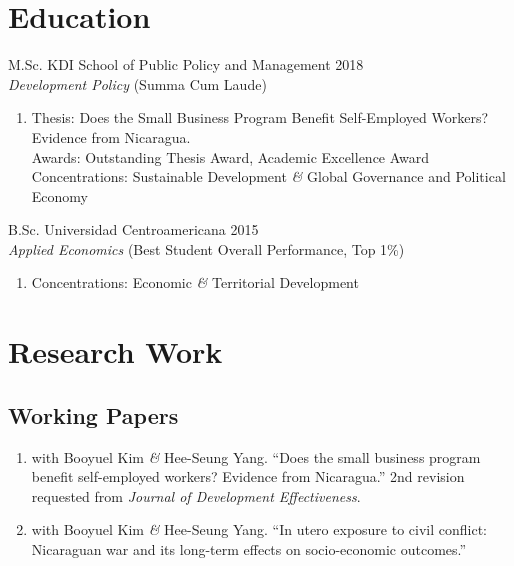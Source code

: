 \documentclass[a4paper, 10pt]{article}
\renewenvironment{itemize}{
  \begin{list}{}
    { \setlength{\itemsep}{5pt}
      \setlength{\parsep}{0pt}
      \setlength{\topsep}{0pt}
      \setlength{\leftmargin}{0em} } }{
  \end{list}}
\begin{document}
\section*{Education}

\begin{itemize}
\item M.Sc. KDI School of Public Policy and Management \hfill 2018 \\
{\small \textit{Development Policy} (Summa Cum Laude)}
  
  \begin{enumerate}[leftmargin=10pt, label={}, nosep]
    \item  Thesis: Does the Small Business Program Benefit Self-Employed Workers? Evidence from Nicaragua. \\ Awards: Outstanding Thesis Award, Academic Excellence Award\\ Concentrations: Sustainable Development \textit{\&} Global Governance and Political Economy
  \end{enumerate}
\item B.Sc. Universidad Centroamericana \hfill 2015 \\
{\small \textit{Applied Economics} (Best Student Overall Performance, Top 1\%)}
  
  \begin{enumerate}[leftmargin=10pt, label={}, nosep]
    \item Concentrations: Economic \textit{\&} Territorial Development
  \end{enumerate}
\end{itemize}


\section*{Research Work}

\subsection*{Working Papers}

\begin{enumerate}[leftmargin=10pt, label={}, itemindent=-10pt, nosep]
\item with Booyuel Kim \textit{\&} Hee-Seung Yang. ``Does the small business program benefit self-employed workers? Evidence from Nicaragua.'' 2nd revision requested from \textit{Journal of Development Effectiveness}.
\item with Booyuel Kim \textit{\&} Hee-Seung Yang. ``In utero exposure to civil conflict: Nicaraguan war and its long-term effects on socio-economic outcomes.''
\end{enumerate}
\end{document}
